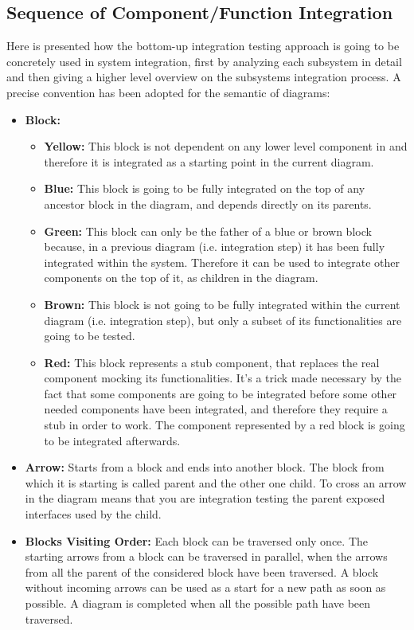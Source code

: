 \subsection{Sequence of Component/Function Integration}
Here is presented how the bottom-up integration testing approach is going to be concretely used in \myTaxiService{} system integration, first by analyzing each subsystem in detail and then giving a higher level overview on the subsystems integration process.
A precise convention has been adopted for the semantic of diagrams:
\begin{itemize}
	\item
		\textbf{Block:}
		\begin{itemize}
			\item \textbf{Yellow:} This block is not dependent on any lower level component in \myTaxiService{} and therefore it is integrated as a starting point in the current diagram.
			\item \textbf{Blue:} This block is going to be fully integrated on the top of any ancestor block in the diagram, and depends directly on its parents.
			\item \textbf{Green:} This block can only be the father of a blue or brown block because, in a previous diagram (i.e. integration step) it has been fully integrated within the system.
			Therefore it can be used to integrate other components on the top of it, as children in the diagram.
			\item \textbf{Brown:} This block is not going to be fully integrated within the current diagram (i.e. integration step), but only a subset of its functionalities are going to be tested.
			\item \textbf{Red:} This block represents a stub component, that replaces the real component mocking its functionalities.
			It's a trick made necessary by the fact that some components are going to be integrated before some other needed components have been integrated, and therefore they require a stub in order to work.
			The component represented by a red block is going to be integrated afterwards.
		\end{itemize}
	\item
		\textbf{Arrow:} Starts from a block and ends into another block.
		The block from which it is starting is called parent and the other one child.
		To cross an arrow in the diagram means that you are integration testing the parent exposed interfaces used by the child.
	\item
		\textbf{Blocks Visiting Order:} Each block can be traversed only once.
		The starting arrows from a block can be traversed in parallel, when the arrows from all the parent of the considered block have been traversed.
		A block without incoming arrows can be used as a start for a new path as soon as possible.
		A diagram is completed when all the possible path have been traversed.
\end{itemize}

